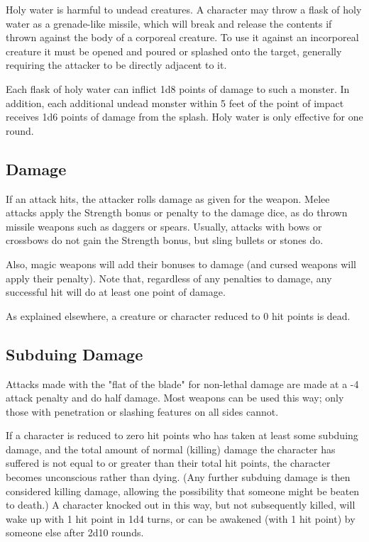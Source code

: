 \documentclass[a4paper,twoside,openany,10pt]{book}
\begin{document}
\begin{multicols}{2}
Holy water is harmful to undead creatures. A character may throw a flask of holy water as a grenade-like missile, which will break and release the contents if thrown against the body of a corporeal creature. To use it against an incorporeal creature it must be opened and poured or splashed onto the target, generally requiring the attacker to be directly adjacent to it.

Each flask of holy water can inflict 1d8 points of damage to such a monster. In addition, each additional undead monster within 5 feet of the point of impact receives 1d6 points of damage from the splash. Holy water is only effective for one round.

\subsection{Damage}\label{damage}

If an attack hits, the attacker rolls damage as given for the weapon. Melee attacks apply the Strength bonus or penalty to the damage dice, as do thrown missile weapons such as daggers or spears. Usually, attacks with bows or crossbows do not gain the Strength bonus, but sling bullets or stones do.

Also, magic weapons will add their bonuses to damage (and cursed weapons will apply their penalty). Note that, regardless of any penalties to damage, any successful hit will do at least one point of damage.

As explained elsewhere, a creature or character reduced to 0 hit points is dead.

\subsection{Subduing Damage}\label{subduing-damage}

Attacks made with the "flat of the blade" for non-lethal damage are made at a -4 attack penalty and do half damage. Most weapons can be used this way; only those with penetration or slashing features on all sides cannot.

If a character is reduced to zero hit points who has taken at least some subduing damage, and the total amount of normal (killing) damage the character has suffered is not equal to or greater than their total hit points, the character becomes unconscious rather than dying. (Any further subduing damage is then considered killing damage, allowing the possibility that someone might be beaten to death.) A character knocked out in this way, but not subsequently killed, will wake up with 1 hit point in 1d4 turns, or can be awakened (with 1 hit point) by someone else after 2d10 rounds.


\end{multicols}
\end{document}
